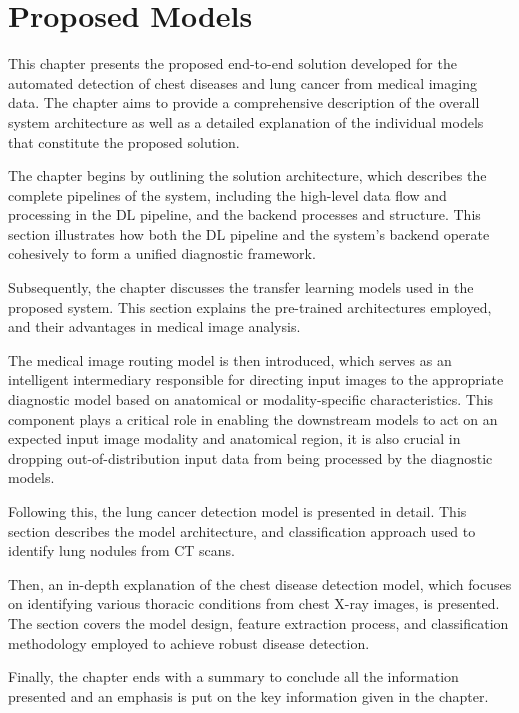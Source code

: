 \chapter{Proposed Models}
\pagestyle{default}
\thispagestyle{default}

This chapter presents the proposed end-to-end solution developed for the automated detection of chest diseases and lung cancer from medical imaging data. The chapter aims to provide a comprehensive description of the overall system architecture as well as a detailed explanation of the individual models that constitute the proposed solution.

The chapter begins by outlining the solution architecture, which describes the complete pipelines of the system, including the high-level data flow and processing in the DL pipeline, and the backend processes and structure. This section illustrates how both the DL pipeline and the system's backend operate cohesively to form a unified diagnostic framework.

Subsequently, the chapter discusses the transfer learning models used in the proposed system. This section explains the pre-trained architectures employed, and their advantages in medical image analysis.

The medical image routing model is then introduced, which serves as an intelligent intermediary responsible for directing input images to the appropriate diagnostic model based on anatomical or modality-specific characteristics. This component plays a critical role in enabling the downstream models to act on an expected input image modality and anatomical region, it is also crucial in dropping out-of-distribution input data from being processed by the diagnostic models.

Following this, the lung cancer detection model is presented in detail. This section describes the model architecture, and classification approach used to identify lung nodules from CT scans.

Then, an in-depth explanation of the chest disease detection model, which focuses on identifying various thoracic conditions from chest X-ray images, is presented. The section covers the model design, feature extraction process, and classification methodology employed to achieve robust disease detection.

Finally, the chapter ends with a summary to conclude all the information presented and an emphasis is put on the key information given in the chapter.



